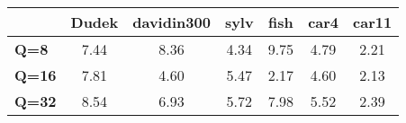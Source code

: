 \begin{tabular}{|l|c|c|c|c|c|c|}
\hline
&\textbf{Dudek}&\textbf{davidin300}&\textbf{sylv}&\textbf{fish}&\textbf{car4}&\textbf{car11}\\\hline
\textbf{Q=8}&7.44&8.36&4.34&9.75&4.79&2.21\\\hline
\textbf{Q=16}&7.81&4.60&5.47&2.17&4.60&2.13\\\hline
\textbf{Q=32}&8.54&6.93&5.72&7.98&5.52&2.39\\\hline
\end{tabular}
